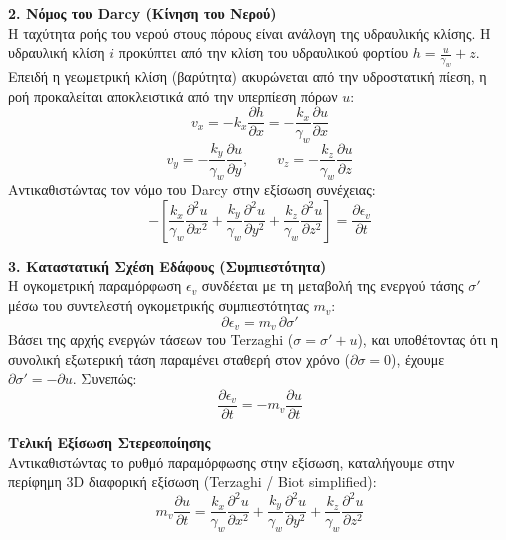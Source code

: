\documentclass[11pt,a4paper]{article}
\begin{document}
\textbf{2. Νόμος του Darcy (Κίνηση του Νερού)}\\
Η ταχύτητα ροής του νερού στους πόρους είναι ανάλογη της υδραυλικής κλίσης. Η υδραυλική κλίση $i$ προκύπτει από την κλίση του υδραυλικού φορτίου $h = \frac{u}{\gamma_w} + z$. Επειδή η γεωμετρική κλίση (βαρύτητα) ακυρώνεται από την υδροστατική πίεση, η ροή προκαλείται αποκλειστικά από την υπερπίεση πόρων $u$:
\begin{equation}
  v_x = -k_x \frac{\partial h}{\partial x} = -\frac{k_x}{\gamma_w}\frac{\partial u}{\partial x}
\end{equation}
\begin{equation}
  v_y = -\frac{k_y}{\gamma_w}\frac{\partial u}{\partial y}, \qquad v_z = -\frac{k_z}{\gamma_w}\frac{\partial u}{\partial z}
\end{equation}
Αντικαθιστώντας τον νόμο του Darcy στην εξίσωση συνέχειας:
\begin{equation}
  -\left[\frac{k_x}{\gamma_w}\frac{\partial^2 u}{\partial x^2} + \frac{k_y}{\gamma_w}\frac{\partial^2 u}{\partial y^2} + \frac{k_z}{\gamma_w}\frac{\partial^2 u}{\partial z^2}\right] = \frac{\partial \epsilon_v}{\partial t}
\end{equation}

\textbf{3. Καταστατική Σχέση Εδάφους (Συμπιεστότητα)}\\
Η ογκομετρική παραμόρφωση $\epsilon_v$ συνδέεται με τη μεταβολή της ενεργού τάσης $\sigma'$ μέσω του συντελεστή ογκομετρικής συμπιεστότητας $m_v$:
\begin{equation}
  \partial\epsilon_v = m_v\,\partial\sigma'
\end{equation}
Βάσει της αρχής ενεργών τάσεων του Terzaghi ($\sigma = \sigma' + u$), και υποθέτοντας ότι η συνολική εξωτερική τάση παραμένει σταθερή στον χρόνο ($\partial\sigma = 0$), έχουμε $\partial\sigma' = -\partial u$. Συνεπώς:
\begin{equation}
  \frac{\partial \epsilon_v}{\partial t} = -m_v \frac{\partial u}{\partial t}
\end{equation}

\textbf{Τελική Εξίσωση Στερεοποίησης}\\
Αντικαθιστώντας το ρυθμό παραμόρφωσης στην εξίσωση, καταλήγουμε στην περίφημη 3D διαφορική εξίσωση (Terzaghi / Biot simplified):
\begin{equation}
  m_v \frac{\partial u}{\partial t} = \frac{k_x}{\gamma_w}\frac{\partial^2 u}{\partial x^2} + \frac{k_y}{\gamma_w}\frac{\partial^2 u}{\partial y^2} + \frac{k_z}{\gamma_w}\frac{\partial^2 u}{\partial z^2}
\end{equation}
\end{document}
